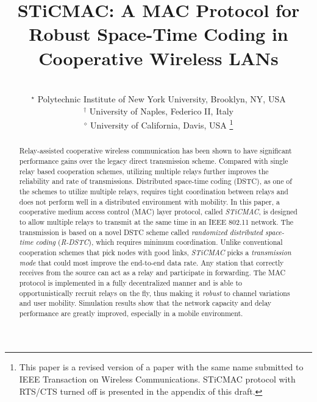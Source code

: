 \documentclass[peerreview,draftcls,onecolumn,12pt,a4paper]{IEEEtran}
\begin{document}
\title{STiCMAC: A MAC Protocol for Robust Space-Time Coding in Cooperative Wireless LANs}

\author{
\\
\authorblockA
{\small $^{\star}$ Polytechnic Institute of New York University,
Brooklyn, NY, USA\\} {\small $^{\dagger}$ University of Naples,
Federico II, Italy \\} {\small $^{\diamond}$ University of
California, Davis, USA}
\thanks{This paper is a revised version of a paper with the same name submitted to IEEE Transaction on Wireless Communications. STiCMAC protocol with RTS/CTS turned off is presented in the appendix of this draft.
}
}

\maketitle


\begin{abstract}

Relay-assisted cooperative wireless communication has been shown to have significant performance gains over the legacy direct transmission scheme. Compared with single relay based cooperation schemes, utilizing multiple relays further improves the reliability and rate of transmissions. Distributed space-time coding (DSTC), as one of the schemes to utilize multiple relays, requires tight coordination between relays and does not perform well in a distributed environment with mobility. In this paper, a cooperative medium access control (MAC) layer protocol, called \emph{STiCMAC}, is designed to allow multiple relays to transmit at the same time in an IEEE 802.11 network. The transmission is based on a novel DSTC scheme called \emph{randomized distributed space-time coding} (\emph{R-DSTC}), which requires minimum coordination. Unlike conventional cooperation schemes that pick nodes with good links, \emph{STiCMAC} picks a \emph{transmission mode} that could most improve the end-to-end data rate. Any station that correctly receives from the source can act as a relay and participate in forwarding. The MAC protocol is implemented in a fully decentralized manner and is able to opportunistically recruit relays on the fly, thus making it \emph{robust} to channel variations and user mobility. Simulation results show that the network capacity and delay performance are greatly improved, especially in a mobile environment.
\end{abstract}
\end{document}
